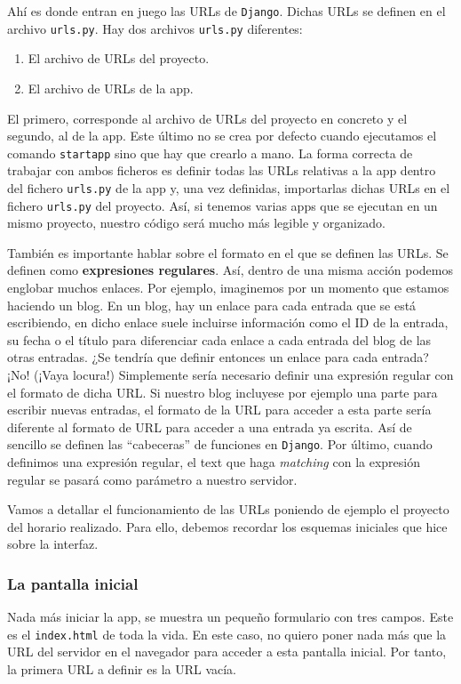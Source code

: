 Ahí es donde entran en juego las URLs de \texttt{Django}. Dichas URLs se definen en el archivo \texttt{urls.py}. Hay dos archivos \texttt{urls.py} diferentes:
\begin{enumerate}[---]
    \item El archivo de URLs del proyecto.
    \item El archivo de URLs de la app.
\end{enumerate}

El primero, corresponde al archivo de URLs del proyecto en concreto y el segundo, al de la app. Este último no se crea por defecto cuando ejecutamos el comando \texttt{startapp} sino que hay que crearlo a mano. La forma correcta de trabajar con ambos ficheros es definir todas las URLs relativas a la app dentro del fichero \texttt{urls.py} de la app y, una vez definidas, importarlas dichas URLs en el fichero \texttt{urls.py} del proyecto. Así, si tenemos varias apps que se ejecutan en un mismo proyecto, nuestro código será mucho más legible y organizado. 

También es importante hablar sobre el formato en el que se definen las URLs. Se definen como \textbf{expresiones regulares}. Así, dentro de una misma acción podemos englobar muchos enlaces. Por ejemplo, imaginemos por un momento que estamos haciendo un blog. En un blog, hay un enlace para cada entrada que se está escribiendo, en dicho enlace suele incluirse información como el ID de la entrada, su fecha o el título para diferenciar cada enlace a cada entrada del blog de las otras entradas. ¿Se tendría que definir entonces un enlace para cada entrada? ¡No! (¡Vaya locura!) Simplemente sería necesario definir una expresión regular con el formato de dicha URL. Si nuestro blog incluyese por ejemplo una parte para escribir nuevas entradas, el formato de la URL para acceder a esta parte sería diferente al formato de URL para acceder a una entrada ya escrita. Así de sencillo se definen las ``cabeceras'' de funciones en \texttt{Django}. Por último, cuando definimos una expresión regular, el text que haga \textit{matching} con la expresión regular se pasará como parámetro a nuestro servidor.

Vamos a detallar el funcionamiento de las URLs poniendo de ejemplo el proyecto del horario realizado. Para ello, debemos recordar los esquemas iniciales que hice sobre la interfaz. 

\subsubsection{La pantalla inicial}
Nada más iniciar la app, se muestra un pequeño formulario con tres campos. Este es el \texttt{index.html} de toda la vida. En este caso, no quiero poner nada más que la URL del servidor en el navegador para acceder a esta pantalla inicial. Por tanto, la primera URL a definir es la URL vacía.

